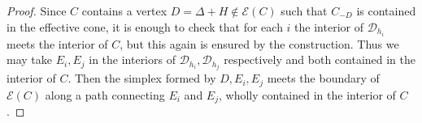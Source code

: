 \begin{proof}
	Since $C$ contains a vertex $D=\Delta+H \notin \mathcal{E}(C)$ such that $C_{-D}$ is contained in the effective cone, it is enough to check that for each $i$ the interior of $\mathcal{D}_{h_{i}}$ meets the interior of $C$, but this again is ensured by the construction. Thus we may take $E_{i},E_{j}$ in the interiors of $\mathcal{D}_{h_{i}},\mathcal{D}_{h_{j}}$ respectively and both contained in the interior of $C$. Then the simplex formed by $D,E_{i},E_{j}$ meets the boundary of $\mathcal{E}(C)$ along a path connecting $E_{i}$ and $E_{j}$, wholly contained in the interior of $C$.

\end{proof}
%	
%
%	
%	
%	
%	
